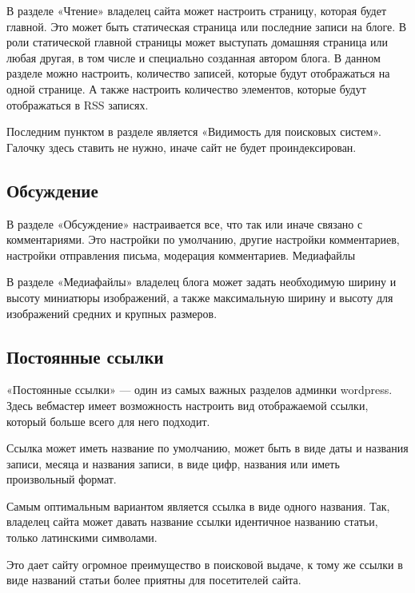 В разделе «Чтение» владелец сайта может настроить страницу, которая будет главной. Это может быть статическая страница или последние записи на блоге. В роли статической главной страницы может выступать домашняя страница или любая другая, в том числе и специально созданная автором блога.
В данном разделе можно настроить, количество записей, которые будут отображаться на одной странице. А также настроить количество элементов, которые будут отображаться в RSS записях.

Последним пунктом в разделе является «Видимость для поисковых систем». Галочку здесь ставить не нужно, иначе сайт не будет проиндексирован.

\subsection{Обсуждение}
\label{sec:part_wp_settings_blog}

В разделе «Обсуждение» настраивается все, что так или иначе связано с комментариями. Это настройки по умолчанию, другие настройки комментариев, настройки отправления письма, модерация комментариев.
Медиафайлы

В разделе «Медиафайлы» владелец блога может задать необходимую ширину и высоту миниатюры изображений, а также максимальную ширину и высоту для изображений средних и крупных размеров.

\subsection{Постоянные ссылки}
\label{sec:part_wp_settings_links}

«Постоянные ссылки» — один из самых важных разделов админки wordpress. Здесь вебмастер имеет возможность настроить вид отображаемой ссылки, который больше всего для него подходит.

Ссылка может иметь название по умолчанию, может быть в виде даты и названия записи, месяца и названия записи, в виде цифр, названия или иметь произвольный формат.

Самым оптимальным вариантом является ссылка в виде одного названия. Так, владелец сайта может давать название ссылки идентичное названию статьи, только латинскими символами.

Это дает сайту огромное преимущество в поисковой выдаче, к тому же ссылки в виде названий статьи более приятны для посетителей сайта.

